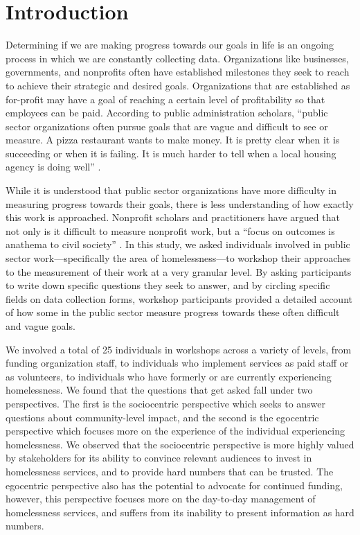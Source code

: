 \section{Introduction}
Determining if we are making progress towards our goals in life is an ongoing process in which we are constantly collecting data. Organizations like businesses, governments, and nonprofits often have established milestones they seek to reach to achieve their strategic and desired goals. Organizations that are established as for-profit may have a goal of reaching a certain level of profitability so that employees can be paid. According to public administration scholars, ``public sector organizations often pursue goals that are vague and difficult to see or measure. A pizza restaurant wants to make money. It is pretty clear when it is succeeding or when it is failing. It is much harder to tell when a local housing agency is doing well'' \citep{Eller2013Public}.

While it is understood that public sector organizations have more difficulty in measuring progress towards their goals, there is less understanding of how exactly this work is approached. Nonprofit scholars and practitioners have argued that not only is it difficult to measure nonprofit work, but a ``focus on outcomes is anathema to civil society'' \citep{Brest2020Outcomes}. In this study, we asked individuals involved in public sector work---specifically the area of homelessness---to workshop their approaches to the measurement of their work at a very granular level. By asking participants to write down specific questions they seek to answer, and by circling specific fields on data collection forms, workshop participants provided a detailed account of how some in the public sector measure progress towards these often difficult and vague goals. 

We involved a total of 25 individuals in workshops across a variety of levels, from funding organization staff, to individuals who implement services as paid staff or as volunteers, to individuals who have formerly or are currently experiencing homelessness. We found that the questions that get asked fall under two perspectives. The first is the sociocentric perspective which seeks to answer questions about community-level impact, and the second is the egocentric perspective which focuses more on the experience of the individual experiencing homelessness. We observed that the sociocentric perspective is more highly valued by stakeholders for its ability to convince relevant audiences to invest in homelessness services, and to provide hard numbers that can be trusted. The egocentric perspective also has the potential to advocate for continued funding, however, this perspective focuses more on the day-to-day management of homelessness services, and suffers from its inability to present information as hard numbers.

